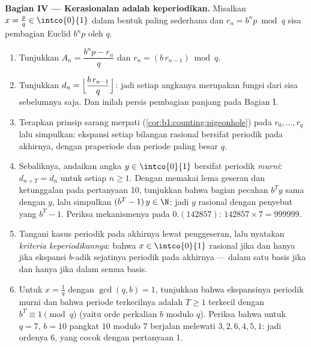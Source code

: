 \begin{problem}
\medskip
\noindent\textbf{Bagian IV --- Kerasionalan adalah keperiodikan.} Misalkan $x
= \frac pq \in \intco{0}{1}$ dalam bentuk paling sederhana dan $r_n = b^n p
\bmod q$ sisa pembagian Euclid $b^n p$ oleh
$q$.
\begin{enumerate}[resume]
  \item Tunjukkan $A_n = \dfrac{b^n p - r_n}{q}$ dan $r_n =
        (b\,r_{n-1}) \bmod q$.
  \item Tunjukkan $d_n = \Bigl\lfloor \dfrac{b\,r_{n-1}}{q}
        \Bigr\rfloor$: jadi setiap angkanya merupakan fungsi dari sisa
        sebelumnya saja. Dan inilah persis pembagian panjang pada
        Bagian I.
  \item Terapkan prinsip sarang merpati
        (\cref{cor:b1:counting:pigeonhole}) pada $r_0, \dots, r_q$
        lalu simpulkan: ekspansi setiap bilangan rasional bersifat
        periodik pada akhirnya, dengan praperiode dan periode paling besar
        $q$.
  \item Sebaliknya, andaikan angka $y \in \intco{0}{1}$
        bersifat periodik \emph{murni}: $d_{n+T} = d_n$ untuk setiap $n
        \geq 1$. Dengan memakai lema geseran dan ketunggalan pada
        pertanyaan 10, tunjukkan bahwa bagian pecahan $b^T y$
        sama dengan $y$, lalu simpulkan $(b^T - 1)\,y \in \N$: jadi $y$
        rasional dengan penyebut yang  $b^T - 1$. Periksa
        mekanismenya pada $0.(142857)$: $142857 \times 7 = 999999$.
  \item Tangani kasus periodik pada akhirnya lewat penggeseran, lalu nyatakan
        \emph{kriteria keperiodikannya}: bahwa $x \in \intco{0}{1}$
        rasional jika dan hanya jika ekspansi $b$-adik sejatinya
        periodik pada akhirnya --- dalam satu basis jika dan hanya jika dalam
        semua basis.
  \item Untuk $x = \frac 1q$ dengan $\gcd(q, b) = 1$, tunjukkan bahwa
        ekspansinya periodik murni dan bahwa periode terkecilnya adalah
        $T \geq 1$ terkecil dengan $b^T \equiv 1 \pmod q$ (yaitu
        orde perkalian $b$ modulo $q$). Periksa bahwa untuk
        $q = 7$, $b = 10$ pangkat $10$ modulo $7$ berjalan
        melewati $3, 2, 6, 4, 5, 1$: jadi ordenya $6$, yang cocok dengan pertanyaan
        1.
\end{enumerate}


\end{problem}
